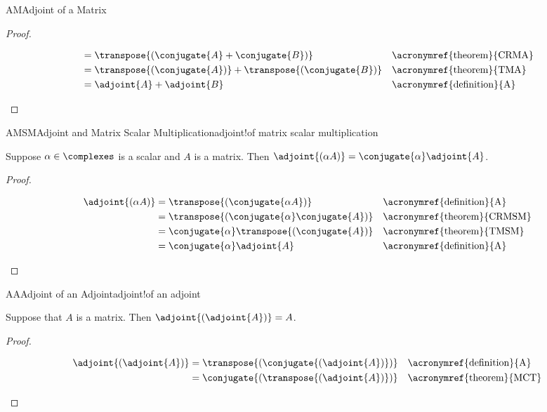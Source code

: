 \begin{subsect}{AM}{Adjoint of a Matrix}
\begin{proof}
\begin{para}
\begin{align*}
%
&=\transpose{\left(\conjugate{A}+\conjugate{B}\right)}
&&\text{\acronymref{theorem}{CRMA}}\\
%
&=\transpose{\left(\conjugate{A}\right)}+\transpose{\left(\conjugate{B}\right)}
&&\text{\acronymref{theorem}{TMA}}\\
%
&=\adjoint{A}+\adjoint{B}
&&\text{\acronymref{definition}{A}}
%
\end{align*}
\end{para}
%
\end{proof}
%
\begin{theorem}{AMSM}{Adjoint and Matrix Scalar Multiplication}{adjoint!of matrix scalar multiplication}
\begin{para}Suppose $\alpha\in\complexes$ is a scalar and $A$ is a matrix.  Then $\adjoint{\left(\alpha A\right)}=\conjugate{\alpha}\adjoint{A}$.\end{para}
\end{theorem}
%
\begin{proof}
%
\begin{para}
\begin{align*}
\adjoint{\left(\alpha A\right)}
&=\transpose{\left(\conjugate{\alpha A}\right)}
&&\text{\acronymref{definition}{A}}\\
%
&=\transpose{\left(\conjugate{\alpha}\conjugate{A}\right)}
&&\text{\acronymref{theorem}{CRMSM}}\\
%
&=\conjugate{\alpha}\transpose{\left(\conjugate{A}\right)}
&&\text{\acronymref{theorem}{TMSM}}\\
%
&=\conjugate{\alpha}\adjoint{A}
&&\text{\acronymref{definition}{A}}
%
\end{align*}
\end{para}
%
\end{proof}
%
\begin{theorem}{AA}{Adjoint of an Adjoint}{adjoint!of an adjoint}
\begin{para}Suppose that $A$ is a matrix.  Then $\adjoint{\left(\adjoint{A}\right)}=A$.\end{para}
\end{theorem}
%
\begin{proof}
%
\begin{para}
\begin{align*}
\adjoint{\left(\adjoint{A}\right)}
&=\transpose{\left(\conjugate{\left(\adjoint{A}\right)}\right)}
&&\text{\acronymref{definition}{A}}\\
%
&=\conjugate{\left(\transpose{\left(\adjoint{A}\right)}\right)}
&&\text{\acronymref{theorem}{MCT}}\\

\end{align*}
\end{para}
\end{proof}
\end{subsect}
